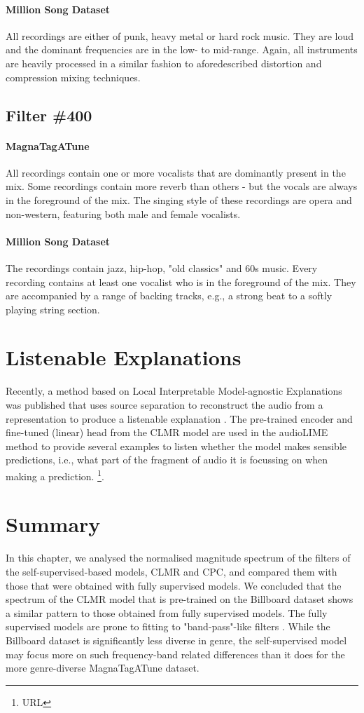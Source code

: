 \paragraph{Million Song Dataset}
All recordings are either of punk, heavy metal or hard rock music. They are loud and the dominant frequencies are in the low- to mid-range. Again, all instruments are heavily processed in a similar fashion to aforedescribed distortion and compression mixing techniques.


\subsection*{Filter \#400}
\paragraph{MagnaTagATune}
All recordings contain one or more vocalists that are dominantly present in the mix. Some recordings contain more reverb than others - but the vocals are always in the foreground of the mix. The singing style of these recordings are opera and non-western, featuring both male and female vocalists.

\paragraph{Million Song Dataset}
The recordings contain jazz, hip-hop, "old classics" and 60s music. Every recording contains at least one vocalist who is in the foreground of the mix. They are accompanied by a range of backing tracks, e.g., a strong beat to a softly playing string section.


\section{Listenable Explanations}
Recently, a method based on Local Interpretable Model-agnostic Explanations was published that uses source separation to reconstruct the audio from a representation to produce a listenable explanation \cite{haunschmid2020audiolime}. The pre-trained encoder and fine-tuned (linear) head from the CLMR model are used in the audioLIME method to provide several examples to listen whether the model makes sensible predictions, i.e., what part of the fragment of audio it is focussing on when making a prediction. \footnote{URL}.


\section*{Summary}
In this chapter, we analysed the normalised magnitude spectrum of the filters of the self-supervised-based models, CLMR and CPC, and compared them with those that were obtained with fully supervised models. We concluded that the spectrum of the CLMR model that is pre-trained on the Billboard dataset shows a similar pattern to those obtained from fully supervised models. The fully supervised models are prone to fitting to "band-pass"-like filters \cite{lee2018samplecnn}. While the Billboard dataset is significantly less diverse in genre, the self-supervised model may focus more on such frequency-band related differences than it does for the more genre-diverse MagnaTagATune dataset.

